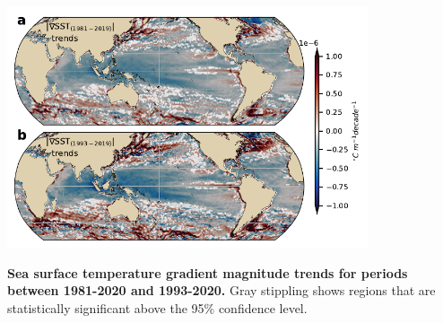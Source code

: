 \documentclass{nature}
\begin{document}
\begin{figureS}
    \centering
	\hspace{0.1\textwidth}\includegraphics[width=0.8\textwidth]{./figures/global_SST_diff_time_records.pdf}
	\caption{\textbf{Sea surface temperature gradient magnitude trends for periods between 1981-2020 and 1993-2020.} Gray stippling shows regions that are statistically significant above the 95\% confidence level. \label{fig:global_significance_trends}}
\end{figureS}
\end{document}
